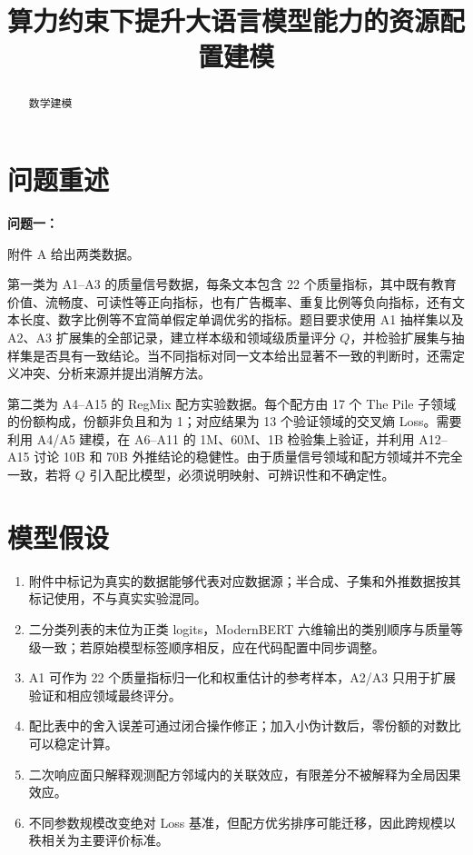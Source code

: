 \documentclass[bwprint]{gmcmthesis}
\title{算力约束下提升大语言模型能力的资源配置建模}   %
\begin{document}
\maketitle


\begin{abstract}    %
    数学建模
\end{abstract}

\pagestyle{plain}

\tableofcontents    %


\section{问题重述}  %
\textbf{问题一：}

附件 A 给出两类数据。

第一类为 A1--A3 的质量信号数据，每条文本包含 22 个质量指标，其中既有教育价值、流畅度、可读性等正向指标，也有广告概率、重复比例等负向指标，还有文本长度、数字比例等不宜简单假定单调优劣的指标。题目要求使用 A1 抽样集以及 A2、A3 扩展集的全部记录，建立样本级和领域级质量评分 $Q$，并检验扩展集与抽样集是否具有一致结论。当不同指标对同一文本给出显著不一致的判断时，还需定义冲突、分析来源并提出消解方法。

第二类为 A4--A15 的 RegMix 配方实验数据。每个配方由 17 个 The Pile 子领域的份额构成，份额非负且和为 1；对应结果为 13 个验证领域的交叉熵 Loss。需要利用 A4/A5 建模，在 A6--A11 的 1M、60M、1B 检验集上验证，并利用 A12--A15 讨论 10B 和 70B 外推结论的稳健性。由于质量信号领域和配方领域并不完全一致，若将 $Q$ 引入配比模型，必须说明映射、可辨识性和不确定性。


\section{模型假设}  %
\begin{enumerate}[label=\textbf{H\arabic*.},leftmargin=2.5em]
    \item 附件中标记为真实的数据能够代表对应数据源；半合成、子集和外推数据按其标记使用，不与真实实验混同。
    \item 二分类列表的末位为正类 logits，ModernBERT 六维输出的类别顺序与质量等级一致；若原始模型标签顺序相反，应在代码配置中同步调整。
    \item A1 可作为 22 个质量指标归一化和权重估计的参考样本，A2/A3 只用于扩展验证和相应领域最终评分。
    \item 配比表中的舍入误差可通过闭合操作修正；加入小伪计数后，零份额的对数比可以稳定计算。
    \item 二次响应面只解释观测配方邻域内的关联效应，有限差分不被解释为全局因果效应。
    \item 不同参数规模改变绝对 Loss 基准，但配方优劣排序可能迁移，因此跨规模以秩相关为主要评价标准。
\end{enumerate}
\end{document}
